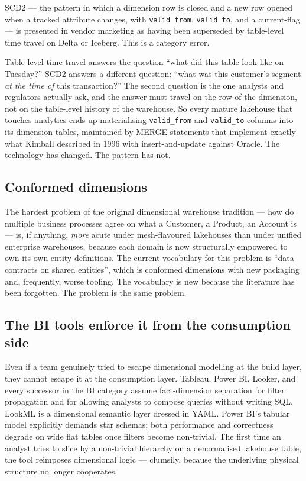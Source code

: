 \documentclass[11pt,a4paper]{article}
\begin{document}
SCD2 --- the pattern in which a dimension row is closed and a new row opened when a tracked attribute changes, with \texttt{valid\_from}, \texttt{valid\_to}, and a current-flag --- is presented in vendor marketing as having been superseded by table-level time travel on Delta or Iceberg. This is a category error.

Table-level time travel answers the question ``what did this table look like on Tuesday?'' SCD2 answers a different question: ``what was this customer's segment \emph{at the time of} this transaction?'' The second question is the one analysts and regulators actually ask, and the answer must travel on the row of the dimension, not on the table-level history of the warehouse. So every mature lakehouse that touches analytics ends up materialising \texttt{valid\_from} and \texttt{valid\_to} columns into its dimension tables, maintained by MERGE statements that implement exactly what Kimball described in 1996 with insert-and-update against Oracle. The technology has changed. The pattern has not.

\subsection{Conformed dimensions}

The hardest problem of the original dimensional warehouse tradition --- how do multiple business processes agree on what a Customer, a Product, an Account is --- is, if anything, \emph{more} acute under mesh-flavoured lakehouses than under unified enterprise warehouses, because each domain is now structurally empowered to own its own entity definitions. The current vocabulary for this problem is ``data contracts on shared entities'', which is conformed dimensions with new packaging and, frequently, worse tooling. The vocabulary is new because the literature has been forgotten. The problem is the same problem.

\subsection{The BI tools enforce it from the consumption side}

Even if a team genuinely tried to escape dimensional modelling at the build layer, they cannot escape it at the consumption layer. Tableau, Power BI, Looker, and every successor in the BI category assume fact-dimension separation for filter propagation and for allowing analysts to compose queries without writing SQL. LookML is a dimensional semantic layer dressed in YAML. Power BI's tabular model explicitly demands star schemas; both performance and correctness degrade on wide flat tables once filters become non-trivial. The first time an analyst tries to slice by a non-trivial hierarchy on a denormalised lakehouse table, the tool reimposes dimensional logic --- clumsily, because the underlying physical structure no longer cooperates.
\end{document}
